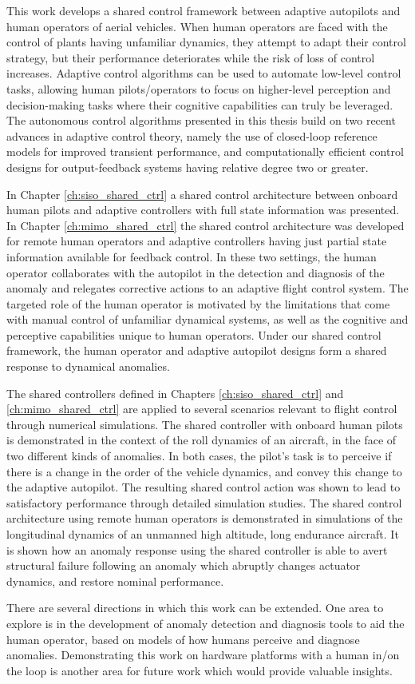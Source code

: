 This work develops a shared control framework between adaptive autopilots and human operators of aerial vehicles. When human operators are faced with the control of plants having unfamiliar dynamics, they attempt to adapt their control strategy, but their performance deteriorates while the risk of loss of control increases. Adaptive control algorithms can be used to automate low-level control tasks, allowing human pilots/operators to focus on higher-level perception and decision-making tasks where their cognitive capabilities can truly be leveraged. The autonomous control algorithms presented in this thesis build on two recent advances in adaptive control theory, namely the use of closed-loop reference models for improved transient performance, and computationally efficient control designs for output-feedback systems having relative degree two or greater. 

In Chapter \ref{ch:siso_shared_ctrl} a shared control architecture between onboard human pilots and adaptive controllers with full state information was presented. In Chapter \ref{ch:mimo_shared_ctrl} the shared control architecture was developed for remote human operators and adaptive controllers having just partial state information available for feedback control. In these two settings, the human operator collaborates with the autopilot in the detection and diagnosis of the anomaly and relegates corrective actions to an adaptive flight control system. The targeted role of the human operator is motivated by the limitations that come with manual control of unfamiliar dynamical systems, as well as the cognitive and perceptive capabilities unique to human operators. Under our shared control framework, the human operator and adaptive autopilot designs form a shared response to dynamical anomalies. 

The shared controllers defined in Chapters \ref{ch:siso_shared_ctrl} and \ref{ch:mimo_shared_ctrl} are applied to several scenarios relevant to flight control through numerical simulations. The shared controller with onboard human pilots is demonstrated in the context of the roll dynamics of an aircraft, in the face of two different kinds of anomalies. In both cases, the pilot's task is to perceive if there is a change in the order of the vehicle dynamics, and convey this change to the adaptive autopilot. The resulting shared control action was shown to lead to satisfactory performance through detailed simulation studies. The shared control architecture using remote human operators is demonstrated in simulations of the longitudinal dynamics of an unmanned high altitude, long endurance aircraft. It is shown how an anomaly response using the shared controller is able to avert structural failure following an anomaly which abruptly changes actuator dynamics, and restore nominal performance.

There are several directions in which this work can be extended. One area to explore is in the development of anomaly detection and diagnosis tools to aid the human operator, based on models of how humans perceive and diagnose anomalies. Demonstrating this work on hardware platforms with a human in/on the loop is another area for future work which would provide valuable insights. 

